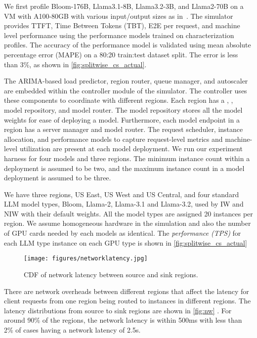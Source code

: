 We first profile Bloom-176B, Llama3.1-8B, Llama3.2-3B, and Llama2-70B on a VM with A100-80GB with various input/output sizes as in~\cite{splitwise}. The simulator provides TTFT, Time Between Tokens (TBT), E2E per request, and machine level performance using the performance models trained on characterization profiles.
The accuracy of the performance model is validated using mean absolute percentage error (MAPE) on a 80:20 train:test dataset split. The error is less than 3\%, as shown in \autoref{fig:splitwise_cs_actual}. 

The ARIMA-based load predictor, region router, queue manager, and autoscaler are embedded within the controller module of the simulator. The controller uses these components to coordinate with different regions. Each region has a , , model repository, and model router. The model repository stores all the model weights for ease of deploying a model.  Furthermore, each model endpoint in a region has a server manager and model router. The request scheduler, instance allocation, and performance models to capture request-level metrics and machine-level utilization are present at each model deployment. We run our experiment harness for four models and three regions. The minimum instance count within a deployment is assumed to be {two}, and the maximum instance count in a model deployment is assumed to be three.


 We have three regions, US East, US West and US Central, and four standard LLM model types, Bloom, Llama-2, Llama-3.1 and Llama-3.2, used by IW and NIW with their default weights. All the model types are assigned 20 instances per region.
We assume homogeneous hardware in the simulation and also the number of GPU cards needed by each models as identical. The \textit{performance (TPS)} for each LLM type instance on each GPU type is shown in \autoref{fig:splitwise_cs_actual}

\begin{figure}[t]
    \centering
    \texttt{[image: figures/networklatency.jpg]}
    \caption{CDF of network latency between source and sink regions.}
    \label{fig:nw}
\end{figure}
 There are network overheads between different regions that affect the latency for client requests from one region being routed to instances in different regions. The latency distributions from source to sink regions are shown in \autoref{fig:nw} . For around 90\% of the regions, the network latency is within 500ms with less than 2\% of cases having a network latency of 2.5s.

